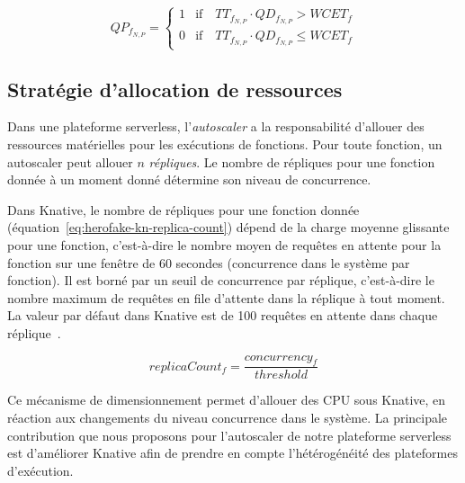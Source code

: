 
\begin{equation}
    QP_{f_{N, P}} =
    \begin{cases}
    1 & \text{if} \quad TT_{f_{N, P}} \cdot QD_{f_{N, P}} > WCET_{f} \\
    0 & \text{if} \quad TT_{f_{N, P}} \cdot QD_{f_{N, P}} \leq WCET_{f}
    \end{cases}
\label{eq:herofake-task-penalty}
\end{equation}

\subsection{Stratégie d'allocation de ressources} \label{section:herofake-autoscaling-strategy}

Dans une plateforme serverless, l'\textit{autoscaler} a la responsabilité d'allouer des ressources matérielles pour les exécutions de fonctions. Pour toute fonction, un autoscaler peut allouer $n$ \textit{répliques}. Le nombre de répliques pour une fonction donnée à un moment donné détermine son niveau de concurrence.

Dans Knative, le nombre de répliques pour une fonction donnée (équation~\ref{eq:herofake-kn-replica-count}) dépend de la charge moyenne glissante pour une fonction, c'est-à-dire le nombre moyen de requêtes en attente pour la fonction sur une fenêtre de 60 secondes (concurrence dans le système par fonction). Il est borné par un seuil de concurrence par réplique, c'est-à-dire le nombre maximum de requêtes en file d'attente dans la réplique à tout moment. La valeur par défaut dans Knative est de 100 requêtes en attente dans chaque réplique~\cite{knative-autoscaling}.

\begin{equation}
    replicaCount_{f} = \frac{concurrency_{f}}{threshold}
\label{eq:herofake-kn-replica-count}
\end{equation}

Ce mécanisme de dimensionnement permet d'allouer des CPU sous Knative, en réaction aux changements du niveau concurrence dans le système. La principale contribution que nous proposons pour l'autoscaler de notre plateforme serverless est d'améliorer Knative afin de prendre en compte l'hétérogénéité des plateformes d'exécution.

